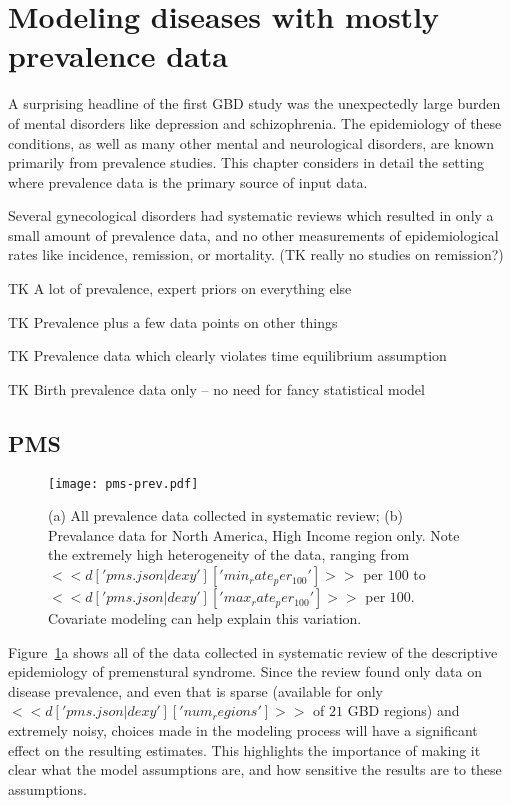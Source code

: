 \section{Modeling diseases with mostly prevalence data}

A surprising headline of the first GBD study was the unexpectedly
large burden of mental disorders like depression and
schizophrenia. The epidemiology of these conditions, as well as many
other mental and neurological disorders, are known primarily from
prevalence studies. This chapter considers in detail the setting where
prevalence data is the primary source of input data.

Several gynecological disorders had systematic reviews which resulted
in only a small amount of prevalence data, and no other measurements
of epidemiological rates like incidence, remission, or mortality.  (TK
really no studies on remission?)

TK A lot of prevalence, expert priors on everything else

TK Prevalence plus a few data points on other things

TK Prevalence data which clearly violates time equilibrium assumption

TK Birth prevalence data only -- no need for fancy statistical model

\subsection{PMS}
\begin{figure}
\begin{center}
\texttt{[image: pms-prev.pdf]}
\end{center}
\caption{(a) All prevalence data collected in systematic review; (b)
  Prevalance data for North America, High Income region only.  Note
  the extremely high heterogeneity of the data, ranging from
  $<<d['pms.json|dexy']['min_rate_per_100']>>$ per $100$ to
  $<<d['pms.json|dexy']['max_rate_per_100']>>$ per $100$.  Covariate
  modeling can help explain this variation.}
\label{pms-prev}
\end{figure}

Figure~\ref{pms-prev}a shows all of the data collected in systematic
review of the descriptive epidemiology of premenstural syndrome.
Since the review found only data on disease prevalence, and even that
is sparse (available for only $<<d['pms.json|dexy']['num_regions']>>$
of $21$ GBD regions) and extremely noisy, choices made in the modeling
process will have a significant effect on the resulting estimates.
This highlights the importance of making it clear what the model assumptions
are, and how sensitive the results are to these assumptions.

